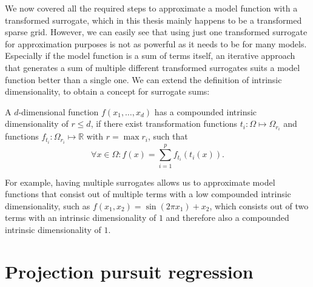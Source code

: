 \documentclass[
  a4paper,  %
  twoside,  %
  bibliography=totoc,
  headsepline,
  cleardoublepage=empty,
  parskip=half,
  draft=false
]{scrbook}
\begin{document}
We now covered all the required steps to approximate a model function with a transformed surrogate, which in this thesis mainly happens to be a transformed sparse grid.
However, we can easily see that using just one transformed surrogate for approximation purposes is not as powerful as it needs to be for many models.
Especially if the model function is a sum of terms itself, an iterative approach that generates a sum of multiple different transformed surrogates suits a model function better than a single one.
We can extend the definition of intrinsic dimensionality, to obtain a concept for surrogate sums:
\begin{definition}
A $d$-dimensional function $f(x_1, \dots, x_d)$ has a compounded intrinsic dimensionality of $r \leq d$, if there exist transformation functions $t_i \colon \Omega \mapsto \Omega_{r_i}$ and functions $f_{t_i} \colon \Omega_{r_i} \mapsto \mathds{R}$ with $r=\max r_i$, such that
\begin{equation}
\forall x \in \Omega \colon f(x)=\sum_{i=1}^p f_{t_i}(t_i(x)).
\end{equation}
\label{def:intrinsic_sum}
\end{definition}
%
For example, having multiple surrogates allows us to approximate model functions that consist out of multiple terms with a low compounded intrinsic dimensionality, such as $f(x_1, x_2)=\sin(2 \pi x_1) + x_2$, which consists out of two terms with an intrinsic dimensionality of $1$ and therefore also a compounded intrinsic dimensionality of $1$.

\section{Projection pursuit regression}
\end{document}
